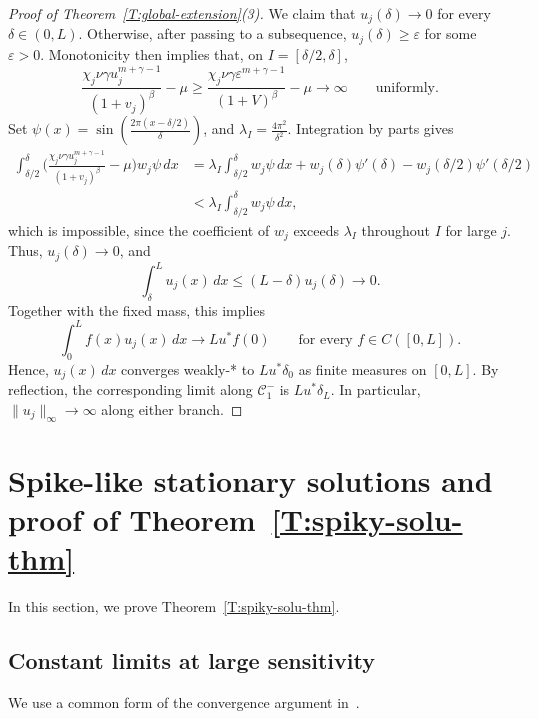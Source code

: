 \documentclass[11pt]{article} %
\theoremstyle{remark}
\theoremstyle{remark}
\numberwithin{equation}{section}
\numberwithin{figure}{section}
\numberwithin{table}{section}
\begin{document}
\begin{proof}[Proof of Theorem~\ref{T:global-extension}(3)]
  We claim that $u_j(\delta) \to 0$ for every $\delta \in (0, L)$. Otherwise,
  after passing to a subsequence, $u_j(\delta) \ge \varepsilon$ for some
  $\varepsilon > 0$. Monotonicity then implies that, on $I = [\delta/2,
  \delta]$,
  \[
    \frac{\chi_j\nu\gamma u_j^{m+\gamma-1}}{(1+v_j)^\beta}-\mu
    \ge
    \frac{\chi_j\nu\gamma\varepsilon^{m+\gamma-1}}{(1+V)^\beta}-\mu
    \longrightarrow\infty
    \qquad\text{uniformly}.
  \]
  Set $\psi(x) = \sin\left(\frac{2\pi(x-\delta/2)}{\delta}\right)$, and
  $\lambda_I = \frac{4\pi^2}{\delta^2}$. Integration by parts gives
  \[
    \begin{aligned}
      \int_{\delta/2}^{\delta}
      \Big(
      \frac{\chi_j\nu\gamma u_j^{m+\gamma-1}}{(1+v_j)^\beta}-\mu
      \Big)w_j\psi\,dx
      &
      =\lambda_I\int_{\delta/2}^{\delta}w_j\psi\,dx
      +w_j(\delta)\psi'(\delta)
      -w_j(\delta/2)\psi'(\delta/2) \\
      &
      <\lambda_I\int_{\delta/2}^{\delta}w_j\psi\,dx,
    \end{aligned}
  \]
  which is impossible, since the coefficient of $w_j$ exceeds $\lambda_I$
  throughout $I$ for large $j$. Thus, $u_j(\delta) \to 0$, and
  \[
    \int_\delta^L u_j(x)\,dx
    \le (L-\delta)u_j(\delta)\longrightarrow0.
  \]
  Together with the fixed mass, this implies
  \[
    \int_0^L f(x)u_j(x)\,dx\longrightarrow Lu^*f(0)
    \qquad\text{for every }f\in C([0,L]).
  \]
  Hence, $u_j(x)\,dx$ converges weakly-* to $Lu^*\delta_0$ as finite measures on
  $[0, L]$. By reflection, the corresponding limit along $\mathcal{C}_1^-$ is
  $Lu^*\delta_L$. In particular, $\|u_j\|_\infty \to \infty$ along either
  branch.
\end{proof}


\section{Spike-like stationary solutions  and proof of Theorem~\ref{T:spiky-solu-thm}}
\label{S:spiky-solu}

In this section, we prove Theorem~\ref{T:spiky-solu-thm}.


\subsection{Constant limits at large sensitivity}

We use a common form of the convergence argument in~\cite[Theorem~4.3, arXiv
version~1]{kurt.shen.ea:24:stability}.
\end{document}
